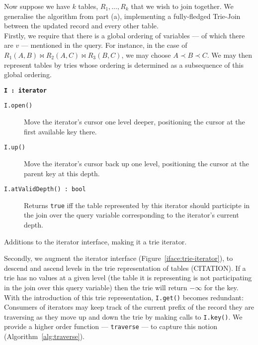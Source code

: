 Now suppose we have $k$ tables, $R_1,\ldots,R_k$ that we wish to join together. We generalise the algorithm from part (a), implementing a fully-fledged Trie-Join between the updated record and every other table.\\[1em]

Firstly, we require that there is a global ordering of variables --- of which there are $v$ --- mentioned in the query. For instance, in the case of $R_1(A,B)\bowtie R_2(A,C)\bowtie R_3(B,C)$, we may choose $A\prec B\prec C$. We may then represent tables by tries whose ordering is determined as a subsequence of this global ordering.\\[1em]

\begin{marginfigure}
  \textbf{\texttt{I\,:\,iterator}}
  \begin{description}
    \item[\texttt{I.open()}]
      Move the iterator's cursor one level deeper, positioning the cursor at the first available key there.
    \item[\texttt{I.up()}]
      Move the iterator's cursor back up one level, positioning the cursor at the parent key at this depth.
    \item[\texttt{I.atValidDepth()\,:\,bool}]
      Returns \texttt{true} iff the table represented by this iterator should participte in the join over the query variable corresponding to the iterator's current depth.
  \end{description}
  \caption{Additions to the iterator interface, making it a trie iterator.}\label{iface:trie-iterator}
\end{marginfigure}

Secondly, we augment the iterator interface (Figure~\ref{iface:trie-iterator}), to descend and ascend levels in the trie representation of tables (CITATION). If a trie has no values at a given level (the table it is representing is not participating in the join over this query variable) then the trie will return $-\infty$ for the key.\\[1em]

With the introduction of this trie representation, \texttt{I.get()} becomes redundant: Consumers of iterators may keep track of the current prefix of the record they are traversing as they move up and down the trie by making calls to \texttt{I.key()}. We provide a higher order function --- \texttt{traverse} --- to capture this notion (Algorithm~\ref{alg:traverse}).\\[1em]

